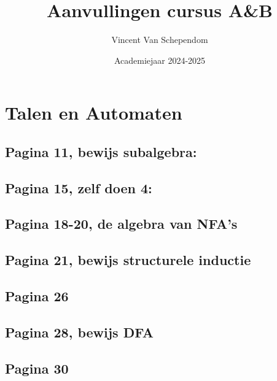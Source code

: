 \documentclass[kulak]{kulakarticle}
\title{Aanvullingen cursus A\&B}
\author{Vincent Van Schependom}
\date{Academiejaar 2024-2025}
\theoremstyle{definition}
\begin{document}
	\maketitle

	\setcounter{section}{1}

	\section{Talen en Automaten}

	\subsection*{Pagina 11, bewijs subalgebra:}

	

	\subsection*{Pagina 15, zelf doen 4:}

	

	\subsection*{Pagina 18-20, de algebra van NFA's}

	

	\subsection*{Pagina 21, bewijs structurele inductie}

	

	\subsection*{Pagina 26}

	

	\newpage
	\subsection*{Pagina 28, bewijs DFA}

	

	\subsection*{Pagina 30}
\end{document}
